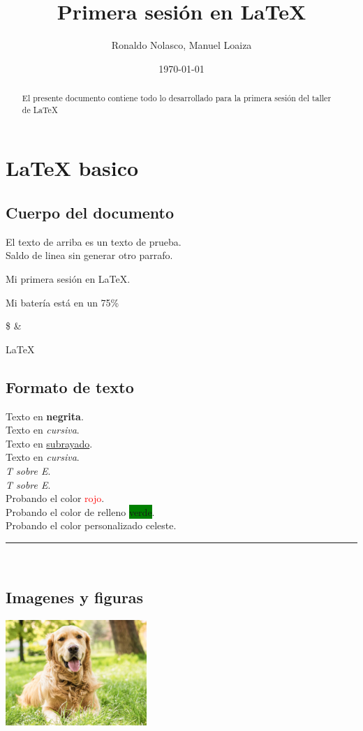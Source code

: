 \documentclass[12pt, letterpaper]{article}
\title{Primera sesión en LaTeX}
\author{Ronaldo Nolasco, Manuel Loaiza}
\date{\today}
\begin{document}
\maketitle
\tableofcontents
\pagebreak

\begin{abstract}
    El presente documento contiene todo lo desarrollado para la primera sesión del taller de LaTeX
\end{abstract}
\pagebreak

\section{LaTeX basico}

\subsection{Cuerpo del documento}

\lipsum[2-3]\newline
El texto de arriba es un texto de prueba.\\
Saldo de linea sin generar otro parrafo.

Mi primera sesión en LaTeX.

Mi batería está en un 75\%

\$ \&

\LaTeX\\

\subsection{Formato de texto}
Texto en \textbf{negrita}.\\
Texto en \textit{cursiva}.\\
Texto en \underline{subrayado}.\\
Texto en \emph{cursiva}.\\
\textit{\emph{T sobre E}}.\\
\emph{\textit{T sobre E}}.\\
Probando el color \textcolor{Red}{rojo}.\\
Probando el color de relleno \colorbox{Green}{verde}.\\
Probando el color personalizado \textcolor{micolor}{celeste}.\\
{\color{micolor}\rule{\linewidth}{1.5mm}}\\

\subsection{Imagenes y figuras}
\includegraphics[height=4cm]{perro.jpg}
\end{document}
